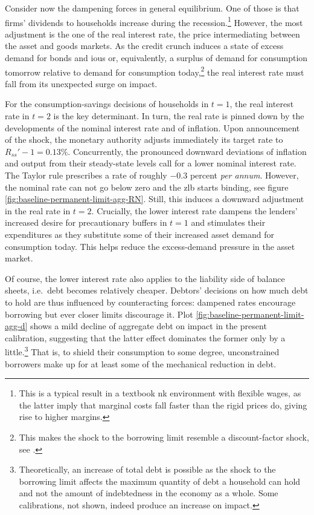 \documentclass[12pt]{article} %
\numberwithin{equation}{section} %
\numberwithin{figure}{section}
\numberwithin{table}{section}
\begin{document}
Consider now the dampening forces in general equilibrium. One of those is that firms' dividends to households increase during the recession.\footnote{This is a typical result in a textbook \Gls{nk} environment with flexible wages, as the latter imply that marginal costs fall faster than the rigid prices do, giving rise to higher margins.} However, the most adjustment is the one of the real interest rate, the price intermediating between the asset and goods markets. As the credit crunch induces a state of excess demand for bonds and \Gls{iou}s or, equivalently, a surplus of demand for consumption tomorrow relative to demand for consumption today,\footnote{This makes the shock to the borrowing limit resemble a discount-factor shock, see \textcite{kv2018}.} the real interest rate must fall from its unexpected surge on impact.

For the consumption-savings decisions of households in $t=1$, the real interest rate in $t=2$ is the key determinant. In turn, the real rate is pinned down by the developments of the nominal interest rate and of inflation. Upon announcement of the shock, the monetary authority adjusts immediately its target rate to $R_{ss}' - 1 = 0.13\%$. Concurrently, the pronounced downward deviations of inflation and output from their steady-state levels call for a lower nominal interest rate. The Taylor rule prescribes a rate of roughly $-0.3$ percent \textit{per annum}. However, the nominal rate can not go below zero and the \Gls{zlb} starts binding, see figure \ref{fig:baseline-permanent-limit-agg-RN}. Still, this induces a downward adjustment in the real rate in $t=2$. Crucially, the lower interest rate dampens the lenders' increased desire for precautionary buffers in $t=1$ and stimulates their expenditures as they substitute some of their increased asset demand for consumption today. This helps reduce the excess-demand pressure in the asset market. 

Of course, the lower interest rate also applies to the liability side of balance sheets, i.e.~debt becomes relatively cheaper. Debtors' decisions on how much debt to hold are thus influenced by counteracting forces: dampened rates encourage borrowing but ever closer limits discourage it. Plot \ref{fig:baseline-permanent-limit-agg-d} shows a mild decline of aggregate debt on impact in the present calibration, suggesting that the latter effect dominates the former only by a little.\footnote{Theoretically, an increase of total debt is possible as the shock to the borrowing limit affects the maximum quantity of debt a household can hold and not the amount of indebtedness in the economy as a whole. Some calibrations, not shown, indeed produce an increase on impact.} That is, to shield their consumption to some degree, unconstrained borrowers make up for at least some of the mechanical reduction in debt. 
\end{document}
